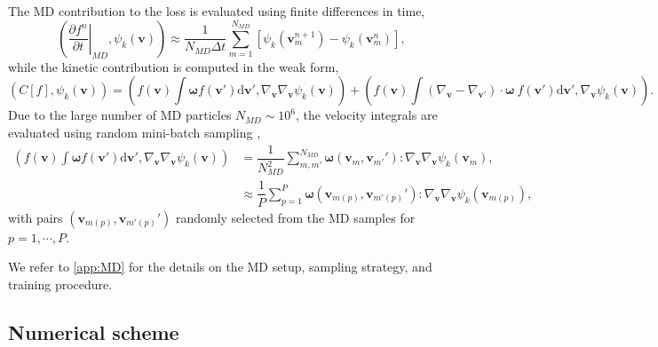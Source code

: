\documentclass[preprint,1p,times]{elsarticle}
\theoremstyle{definition}
\theoremstyle{remark}
\begin{document}
The MD contribution to the loss is evaluated using finite differences in time,
\begin{equation}
    \left(\left.\dfrac{\partial f^n}{\partial t}\right|_{MD}, \psi_k(\bm{v})\right) \approx
    \dfrac{1}{N_{MD}\Delta t}\sum_{m=1}^{N_{MD}} [\psi_k(\bm{v}_{m}^{n+1})-\psi_k(\bm{v}_{m}^{n})] ,
\end{equation}
while the kinetic contribution is computed in the weak form,
\begin{equation}
    \left(C[f],\psi_k(\boldsymbol{v})\right) 
    = \left(f(\boldsymbol{v})\int \boldsymbol{\omega} f(\boldsymbol{v}')\mathrm{d}\boldsymbol{v}', \nabla_{\boldsymbol{v}} \nabla_{\boldsymbol{v}} \psi_k(\boldsymbol{v})\right) 
    + \left( f(\boldsymbol{v}) \int (\nabla_{\boldsymbol{v}} - \nabla_{\boldsymbol{v}'}) \cdot \boldsymbol{\omega} ~  f(\boldsymbol{v}') \mathrm{d}\boldsymbol{v}', \nabla_{\boldsymbol{v}} \psi_k (\boldsymbol{v}) \right) .
\end{equation}
Due to the large number of MD particles $N_{MD} \sim 10^{6}$, the velocity integrals are evaluated using random mini-batch sampling \cite{ketkar2017stochastic, li2014efficient, jin2020random, jin2021random},
\begin{equation}
    \begin{aligned}
        \left( f(\boldsymbol{v})\int \boldsymbol{\omega} f(\boldsymbol{v}')\mathrm{d}\boldsymbol{v}', \nabla_{\boldsymbol{v}} \nabla_{\boldsymbol{v}} \psi_k(\boldsymbol{v}) \right) &=
        \dfrac{1}{N_{MD}^2}\sum_{m,m'}^{N_{MD}} \boldsymbol{\omega}(\boldsymbol{v}_{m},\boldsymbol{v}_{m'} ') : \nabla_{\boldsymbol{v}} \nabla_{\boldsymbol{v}} \psi_k(\boldsymbol{v}_{m}), \\
        &\approx \dfrac{1}{P}\sum_{p=1}^{P} \boldsymbol{\omega}(\boldsymbol{v}_{m(p)},\boldsymbol{v}_{m'(p)} ') : \nabla_{\boldsymbol{v}} \nabla_{\boldsymbol{v}} \psi_k(\boldsymbol{v}_{m(p)}),
    \end{aligned}
\end{equation}
with pairs $(\bm{v}_{m(p)}, \bm{v}_{m'(p)} ')$ randomly selected from the MD samples for $p=1,\cdots,P$.

We refer to  \ref{app:MD} for the details on the MD setup, sampling strategy, and training procedure.



\subsection{Numerical scheme}
\label{sec:numerical_scheme}
\end{document}
